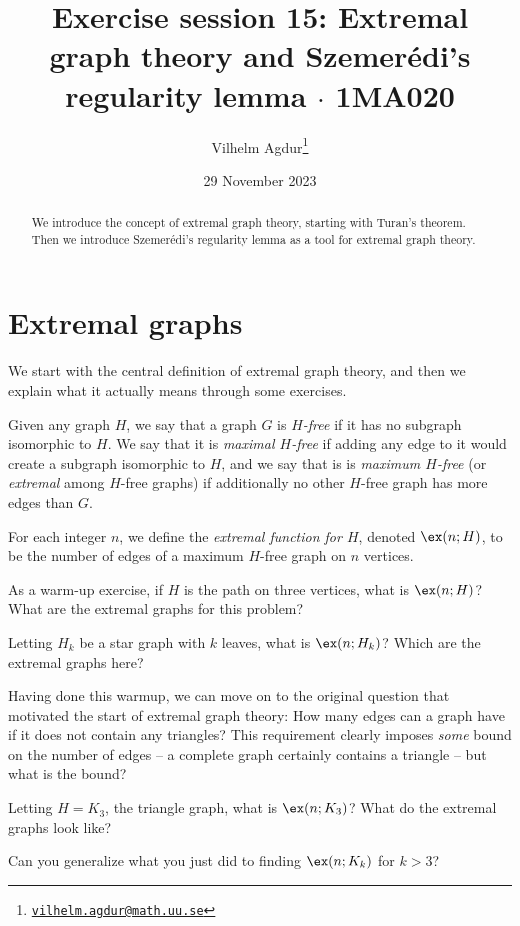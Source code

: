 \documentclass[nobib]{tufte-handout}
\title{Exercise session 15: Extremal graph theory and Szemerédi's regularity lemma $\cdot$ 1MA020}
\author[Vilhelm Agdur]{Vilhelm Agdur\thanks{\href{mailto:vilhelm.agdur@math.uu.se}{\nolinkurl{vilhelm.agdur@math.uu.se}}}}
\date{29 November 2023}
\begin{document}
\maketitle%

\begin{abstract}
\noindent
We introduce the concept of extremal graph theory, starting with Turan's theorem. Then we introduce Szemerédi's regularity lemma as a tool for extremal graph theory.
\end{abstract}

\section{Extremal graphs}

We start with the central definition of extremal graph theory, and then we explain what it actually means through some exercises.

\begin{definition}
  Given any graph $H$, we say that a graph $G$ is \emph{$H$-free} if it has no subgraph isomorphic to $H$. We say that it is \emph{maximal $H$-free} if adding any edge to it would create a subgraph isomorphic to $H$, and we say that is is \emph{maximum $H$-free} (or \emph{extremal} among $H$-free graphs) if additionally no other $H$-free graph has more edges than $G$.

  For each integer $n$, we define the \emph{extremal function for $H$}, denoted $\ex(n; H)$, to be the number of edges of a maximum $H$-free graph on $n$ vertices.
\end{definition}

\begin{xca}
  As a warm-up exercise, if $H$ is the path on three vertices, what is $\ex(n;H)$? What are the extremal graphs for this problem?

  Letting $H_k$ be a star graph with $k$ leaves, what is $\ex(n;H_k)$? Which are the extremal graphs here?
\end{xca}

Having done this warmup, we can move on to the original question that motivated the start of extremal graph theory: How many edges can a graph have if it does not contain any triangles? This requirement clearly imposes \emph{some} bound on the number of edges -- a complete graph certainly contains a triangle -- but what is the bound?

\begin{xca}
  Letting $H = K_3$, the triangle graph, what is $\ex(n; K_3)$? What do the extremal graphs look like?
\end{xca}

\begin{xca}
  Can you generalize what you just did to finding $\ex(n; K_k)$ for $k > 3$?
\end{xca}

%
%
\end{document}
